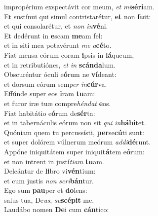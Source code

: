 \evenverse impropérium exspectávit cor meum, \textit{et} \textit{mi}\textbf{sé}\textbf{ri}am.\\
\oddverse Et sustínui qui simul contristarétur, \textbf{et} non \textbf{fu}it:~\*\\
\oddverse et qui consolarétur, et \textit{non} \textit{in}\textbf{vé}ni.\\
\evenverse Et dedérunt in \textbf{e}scam \textbf{me}am fel:~\*\\
\evenverse et in siti mea potavérunt \textit{me} \textit{a}\textbf{cé}to.\\
\oddverse Fiat mensa eórum coram \textbf{i}psis in \textbf{lá}queum,~\*\\
\oddverse et in retributiónes, \textit{et} \textit{in} \textbf{scán}\textbf{da}lum.\\
\evenverse Obscuréntur óculi e\textbf{ó}rum ne \textbf{ví}deant:~\*\\
\evenverse et dorsum eórum sem\textit{per} \textit{in}\textbf{cúr}va.\\
\oddverse Effúnde super eos \textbf{i}ram \textbf{tu}am:~\*\\
\oddverse et furor iræ tuæ compre\textit{hén}\textit{dat} \textbf{e}os.\\
\evenverse Fiat habitátio e\textbf{ó}rum de\textbf{sér}ta:~\*\\
\evenverse et in tabernáculis eórum non sit \textit{qui} \textit{in}\textbf{há}\textbf{bi}tet.\\
\oddverse Quóniam quem tu percussísti, \textbf{per}se\textbf{cú}ti sunt:~\*\\
\oddverse et super dolórem vúlnerum meórum \textit{ad}\textit{di}\textbf{dé}runt.\\
\evenverse Appóne iniquitátem super iniqui\textbf{tá}tem e\textbf{ó}rum:~\*\\
\evenverse et non intrent in justí\textit{ti}\textit{am} \textbf{tu}am.\\
\oddverse Deleántur de \textbf{li}bro vi\textbf{vén}tium:~\*\\
\oddverse et cum justis \textit{non} \textit{scri}\textbf{bán}tur.\\
\evenverse Ego sum \textbf{pau}per et \textbf{do}lens:~\*\\
\evenverse salus tua, De\textit{us}, \textit{su}\textbf{scé}\textbf{pit} me.\\
\oddverse Laudábo nomen \textbf{De}i cum \textbf{cán}tico:~\*\\
